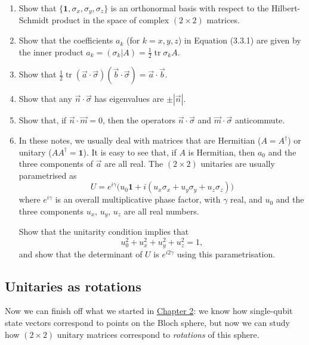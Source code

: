 \documentclass[fleqn]{article}
\begin{document}
\begin{enumerate}
\def\labelenumi{\arabic{enumi}.}
\item
  Show that \(\{\mathbf{1},\sigma_x,\sigma_y,\sigma_z\}\) is an orthonormal basis with respect to the Hilbert-Schmidt product in the space of complex \((2\times 2)\) matrices.
\item
  Show that the coefficients \(a_k\) (for \(k=x,y,z\)) in Equation (3.3.1) are given by the inner product \(a_k = (\sigma_k|A) = \frac12\operatorname{tr}\sigma_k A\).
\item
  Show that \(\frac12\operatorname{tr}(\vec{a}\cdot\vec{\sigma})(\vec{b}\cdot\vec{\sigma}) = \vec{a}\cdot\vec{b}\).
\item
  Show that any \(\vec{n}\cdot\vec{\sigma}\) has eigenvalues are \(\pm|\vec{n}|\).
\item
  Show that, if \(\vec{n}\cdot\vec{m}=0\), then the operators \(\vec{n}\cdot\vec{\sigma}\) and \(\vec{m}\cdot\vec{\sigma}\) anticommute.
\item
  In these notes, we usually deal with matrices that are Hermitian (\(A=A^\dagger\)) or unitary (\(AA^\dagger=\mathbf{1}\)).
  It is easy to see that, if \(A\) is Hermitian, then \(a_0\) and the three components of \(\vec{a}\) are all real.
  The \((2\times 2)\) unitaries are usually parametrised as
  \[
     U = e^{i\gamma}\Big(u_0\mathbf{1}+ i(u_x\sigma_x + u_y\sigma_y + u_z\sigma_z)\Big)
   \]
  where \(e^{i\gamma}\) is an overall multiplicative phase factor, with \(\gamma\) real, and \(u_0\) and the three components \(u_x\), \(u_y\), \(u_z\) are all real numbers.

  Show that the unitarity condition implies that
  \[
     u_0^2 + u_x^2 + u_y^2 + u_z^2 = 1,
   \]
  and show that the determinant of \(U\) is \(e^{i2\gamma}\) using this parametrisation.
\end{enumerate}

\hypertarget{unitaries-as-rotations}{%
\subsection{Unitaries as rotations}\label{unitaries-as-rotations}}

Now we can finish off what we started in \protect\hyperlink{chapter2}{Chapter 2}: we know how single-qubit state vectors correspond to points on the Bloch sphere, but now we can study how \((2\times 2)\) unitary matrices correspond to \emph{rotations} of this sphere.
\end{document}
